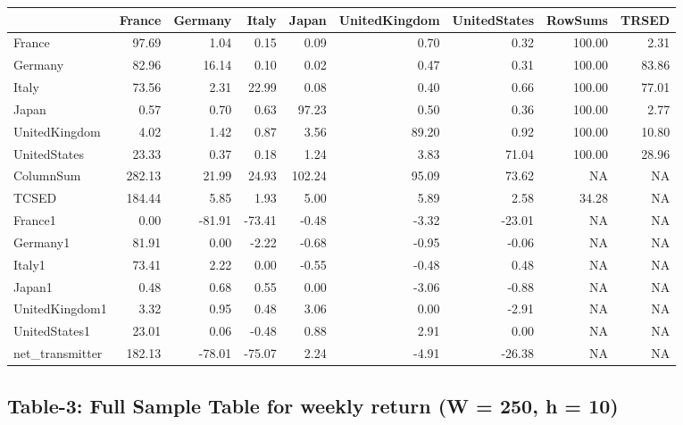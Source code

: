 \documentclass[]{elsarticle} %
\begin{document}
\begin{tabular}{lrrrrrrrr}
\toprule
  & France & Germany & Italy & Japan & UnitedKingdom & UnitedStates & RowSums & TRSED\\
\midrule
France & 97.69 & 1.04 & 0.15 & 0.09 & 0.70 & 0.32 & 100.00 & 2.31\\
Germany & 82.96 & 16.14 & 0.10 & 0.02 & 0.47 & 0.31 & 100.00 & 83.86\\
Italy & 73.56 & 2.31 & 22.99 & 0.08 & 0.40 & 0.66 & 100.00 & 77.01\\
Japan & 0.57 & 0.70 & 0.63 & 97.23 & 0.50 & 0.36 & 100.00 & 2.77\\
UnitedKingdom & 4.02 & 1.42 & 0.87 & 3.56 & 89.20 & 0.92 & 100.00 & 10.80\\
\addlinespace
UnitedStates & 23.33 & 0.37 & 0.18 & 1.24 & 3.83 & 71.04 & 100.00 & 28.96\\
ColumnSum & 282.13 & 21.99 & 24.93 & 102.24 & 95.09 & 73.62 & NA & NA\\
TCSED & 184.44 & 5.85 & 1.93 & 5.00 & 5.89 & 2.58 & 34.28 & NA\\
France1 & 0.00 & -81.91 & -73.41 & -0.48 & -3.32 & -23.01 & NA & NA\\
Germany1 & 81.91 & 0.00 & -2.22 & -0.68 & -0.95 & -0.06 & NA & NA\\
\addlinespace
Italy1 & 73.41 & 2.22 & 0.00 & -0.55 & -0.48 & 0.48 & NA & NA\\
Japan1 & 0.48 & 0.68 & 0.55 & 0.00 & -3.06 & -0.88 & NA & NA\\
UnitedKingdom1 & 3.32 & 0.95 & 0.48 & 3.06 & 0.00 & -2.91 & NA & NA\\
UnitedStates1 & 23.01 & 0.06 & -0.48 & 0.88 & 2.91 & 0.00 & NA & NA\\
net\_transmitter & 182.13 & -78.01 & -75.07 & 2.24 & -4.91 & -26.38 & NA & NA\\
\bottomrule
\end{tabular}

\subsection{\texorpdfstring{\textbf{Table-3: Full Sample Table for
weekly return (W = 250, h =
10)}}{Table-3: Full Sample Table for weekly return (W = 250, h = 10)}}\label{table-3-full-sample-table-for-weekly-return-w-250-h-10}
\end{document}

